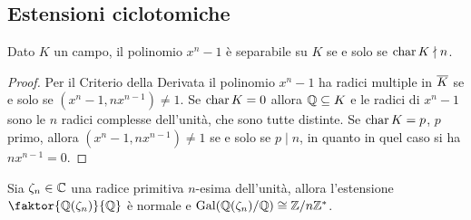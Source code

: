 \documentclass[11pt]{scrartcl}
\begin{document}
	\subsection{Estensioni ciclotomiche}
	
	\begin{lemma}
		\label{lemma3.8}
		Dato $K$ un campo, il polinomio $x^n - 1$ è separabile su $K$ se e solo 
		se $\text{char}\,{K} \nmid n$.
	\end{lemma}
	
	\begin{proof}
		Per il Criterio della Derivata il polinomio $x^n - 1$ ha radici multiple
		in $\overline{K}$ se e solo se $(x^n - 1, nx^{n - 1}) \neq 1$. Se $\text{char}\, K = 0$
		allora $\mathbb Q\subseteq K$ e le radici di 
		$x^n - 1$ sono le $n$ radici complesse dell'unità, che sono tutte distinte.
		Se $\text{char}\, K = p$, $p$ primo, allora $(x^n - 1, nx^{n - 1}) \neq 1$ se e solo
		se $p \mid n$, in quanto in quel caso si ha $nx^{n - 1} = 0$.
	\end{proof}
	
	\begin{theorem}
		\label{teorema3.9}
		Sia $\zeta_n\in \mathbb C$ una radice primitiva $n$-esima dell'unità, allora
		l'estensione $\faktor{\QQ(\zeta_n)}{\QQ}$ è normale e 
		$\operatorname{Gal}(\mathbb Q(\zeta_n)/\mathbb Q)\cong {\mathbb Z}/n{\mathbb Z}^*$.
	\end{theorem}
	
\end{document}
